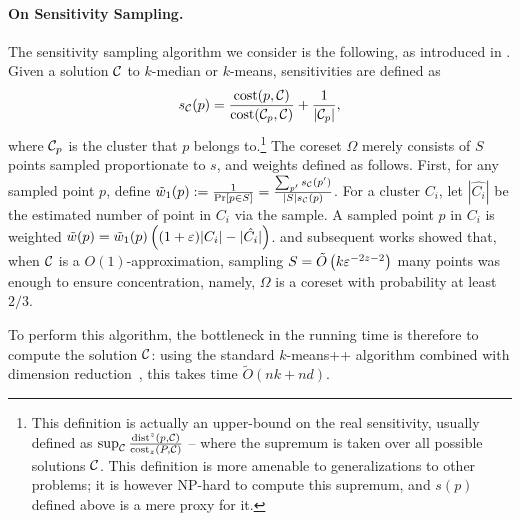 \paragraph*{On Sensitivity Sampling.}
The sensitivity sampling algorithm we consider is the following, as introduced in \cite{FeldmanL11}.
Given a solution $\mathcal C$ to $k$-median or $k$-means, sensitivities are defined as
\begin{equation}
\label{eq:sensitivity}
 s_\mathcal C(p) = \dfrac{\operatorname{cost}(p, \mathcal C)}{\operatorname{cost}(\mathcal C_{p}, \mathcal C)} + \dfrac{1}{|\mathcal C_p|},
\end{equation}
where $\mathcal C_p$ is the cluster that $p$ belongs to.\footnote{This definition is actually an upper-bound on the real sensitivity, 
usually defined as $\sup_{\mathcal C} \frac{\operatorname{dist}^z(p, \mathcal C)}{\operatorname{cost}_z(P, \mathcal C)}$ -- where the supremum is taken over all possible solutions $\mathcal C$.
 This definition is more amenable to generalizations to other problems; it is however NP-hard to compute this supremum, and $s(p)$ defined above is a mere proxy for it.}
The coreset $\Omega$ merely consists of $S$ points sampled proportionate to $s$, and weights defined as follows. First, for any sampled point $p$, define $\tilde w_1(p) := \frac{1}{\Pr[p \in S]} = \frac{\sum_{p'} s_\mathcal C(p')}{|S| s_\mathcal C(p)}$. For a cluster $C_i$, let $|\hat{C_i}|$ be the estimated number of point in $C_i$ via the sample. A sampled point $p$ in $C_i$ is weighted $\tilde w(p) = \tilde w_1(p) \left( (1+\varepsilon)|C_i| - |\hat{C_i}|\right)$.
%
\cite{FeldmanL11} and subsequent works showed that, when $\mathcal C$ is a $O(1)$-approximation, sampling $S = \tilde O\left( k \varepsilon^{-2z-2}\right)$ many points was enough to ensure concentration, namely, $\Omega$ is a coreset with probability at least $2/3$.

 To perform this algorithm, the bottleneck in the running time is therefore to compute the solution $\mathcal C$: using the standard $k$-means++ algorithm \cite{ArV07} combined with dimension reduction~\cite{NaN18}, this takes time $\tilde O(nk +nd)$. 



